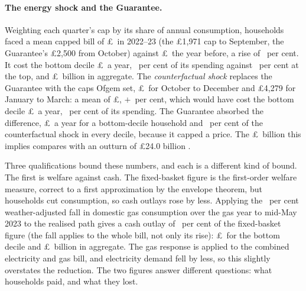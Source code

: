 \paragraph{The energy shock and the Guarantee.} Weighting each
quarter's cap by its share of annual consumption, households faced a
mean capped bill of \pounds\MsEnergyRealisedMeanCapFyTwentyTwo\ in
2022--23 (the \pounds 1{,}971 cap to September, the Guarantee's
\pounds 2{,}500 from October) against
\pounds\MsEnergyRealisedMeanCapFyTwentyOne\ the year before, a rise
of \MsEnergyRealisedRisePct\ per cent. It cost the bottom decile
\pounds\MsEnergyRealisedGbpDecOne\ a year,
\MsEnergyRealisedPctSpendDecOne\ per cent of its spending against
\MsEnergyRealisedPctSpendDecTen\ per cent at the top, and
\pounds\MsEnergyRealisedAggBn\ billion in aggregate. The
\emph{counterfactual shock} replaces the Guarantee with the caps Ofgem
set, \pounds\MsEnergyCapPeak\ for October to December and
\pounds 4{,}279 for January to March: a mean of
\pounds\SsCounterFyCap, $+$\MsEnergyGrossFactorPct\ per cent, which
would have cost the bottom decile \pounds\MsEnergyGrossGbpDecOne\ a
year, \MsEnergyGrossPctSpendDecOne\ per cent of its spending. The
Guarantee absorbed the difference, \pounds\MsEnergyCushionGbpDecOne\ a
year for a bottom-decile household and
\MsEnergyCushionShareFyPct\ per cent of the counterfactual shock in
every decile, because it capped a price. The
\pounds\MsEnergyCushionAggSixMonthsBn\ billion this implies compares
with an outturn of \pounds 24.0 billion \citep{nao2024}.

Three qualifications bound these numbers, and each is a different
kind of bound. The first is welfare against cash. The fixed-basket
figure is the first-order welfare measure, correct to a first
approximation by the envelope theorem, but households cut consumption,
so cash outlays rose by less. Applying the
\MsEnergyObservedDemandFallPct\ per cent weather-adjusted fall in
domestic gas consumption over the gas year to mid-May 2023
\citep{desnz2024} to the realised path gives a cash outlay of
\MsEnergyCashOutlayScalePct\ per cent of the fixed-basket figure (the
fall applies to the whole bill, not only its rise):
\pounds\MsEnergyCashOutlayGbpDecOne\ for the bottom decile and
\pounds\MsEnergyCashOutlayAggBn\ billion in aggregate. The gas
response is applied to the combined electricity and gas bill, and
electricity demand fell by less, so this slightly overstates the
reduction. The two figures answer different questions: what households
paid, and what they lost.

